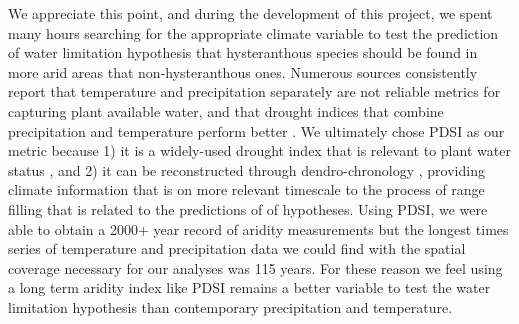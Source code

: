 \documentclass{article}[12pt]
\begin{document}
We appreciate this point, and during the development of this project, we spent many hours searching for the appropriate climate variable to test the prediction of water limitation hypothesis that hysteranthous species should be found in more arid areas that non-hysteranthous ones. Numerous sources consistently report that temperature and precipitation separately are not reliable metrics for capturing plant available water, and that drought indices that combine precipitation and temperature perform better \citep{Moles_2014,Piedallu_2013,Hickler_2009}. We ultimately chose PDSI as our metric because 1) it is a widely-used drought index that is relevant to plant water status \citep{Dai:2004aa,MIKA2005223}, and 2) it can be reconstructed through dendro-chronology \citep{Cook_2010}, providing climate information that is on more relevant timescale to the process of range filling that is related to the predictions of of hypotheses. Using PDSI, we were able to obtain a 2000+ year record of aridity measurements but the longest times series of temperature and precipitation data we could find with the spatial coverage necessary for our analyses was 115 years. %
For these reason we feel using a long term aridity index like PDSI remains a better variable to test the water limitation hypothesis than contemporary precipitation and temperature. 



\end{document}
